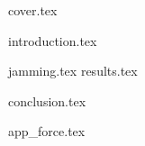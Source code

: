 \documentclass[a4paper]{report}
\begin{document}
{cover.tex}

\tableofcontents
\thispagestyle{empty}
\newpage
\setcounter{page}{1}

{introduction.tex}

{jamming.tex}
{results.tex}

{conclusion.tex}

\newpage
{}

{\renewcommand{\bibname}{References}}

\appendix
{}

{app_force.tex}
\end{document}
